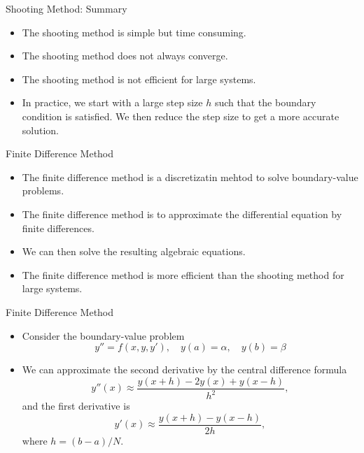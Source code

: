 \documentclass{beamer}
\begin{document}
\begin{frame}{Shooting Method: Summary}
    \begin{itemize}
        \item The shooting method is simple but time consuming.
        \item The shooting method does not always converge.
        \item The shooting method is not efficient for large systems.
        \item In practice, we start with a large step size $h$ such that the boundary
        condition is satisfied. We then reduce the step size to get a more accurate solution.

    \end{itemize}
\end{frame}
\begin{frame}{Finite Difference Method}
    \begin{itemize}
        \item The finite difference method is a discretizatin mehtod to solve boundary-value problems.
        \item The finite difference method is to approximate the differential equation by finite differences.
        \item We can then solve the resulting algebraic equations.
        \item The finite difference method is more efficient than the shooting method for large systems.
    \end{itemize}

\end{frame}
\begin{frame}{Finite Difference Method}
    \begin{itemize}
        \item Consider the boundary-value problem
        \[
        y'' = f(x, y, y'), \quad y(a) = \alpha, \quad y(b) = \beta
        \]
        \item We can approximate the second derivative by the central difference formula
        \[
        y''(x) \approx \frac{y(x+h) - 2y(x) + y(x-h)}{h^2},
        \]
        and the first derivative is 
        \[
        y'(x) \approx \frac{y(x+h) - y(x-h)}{2h},
        \]
        where $h=(b-a)/N$. 
        
    \end{itemize}
\end{frame}
\end{document}
